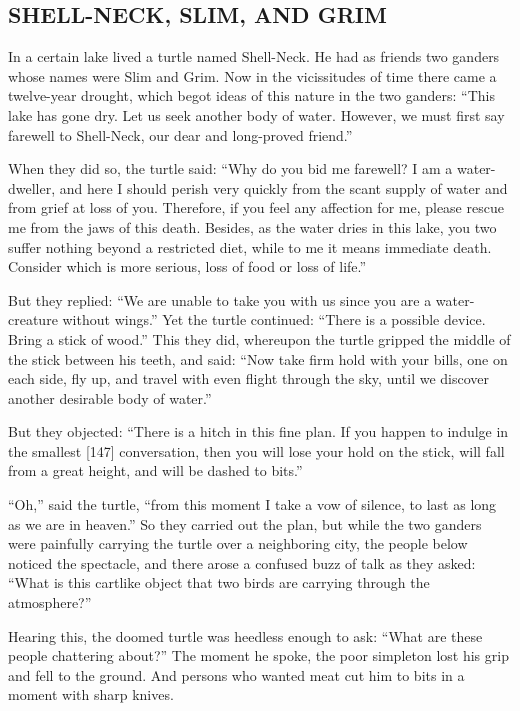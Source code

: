 \documentclass{article}
\begin{document}
\subsection{SHELL-NECK, SLIM, AND GRIM}

In a certain lake lived a turtle named Shell-Neck. He had as
friends two ganders whose names were Slim and Grim. Now in the
vicissitudes of time there came a twelve-year drought, which begot
ideas of this nature in the two ganders:
``This lake has gone dry. Let us seek another body of water. However, we must first say farewell to Shell-Neck, our dear and long-proved friend.''

When they did so, the turtle said:
``Why do you bid me farewell? I am a water-dweller, and here I should perish very quickly from the scant supply of water and from grief at loss of you. Therefore, if you feel any affection for me, please rescue me from the jaws of this death. Besides, as the water dries in this lake, you two suffer nothing beyond a restricted diet, while to me it means immediate death. Consider which is more serious, loss of food or loss of life.''

But they replied:
``We are unable to take you with us since you are a water-creature without wings.''
Yet the turtle continued:
``There is a possible device. Bring a stick of wood.'' This they
did, whereupon the turtle gripped the middle of the stick between
his teeth, and said:
``Now take firm hold with your bills, one on each side, fly up, and travel with even flight through the sky, until we discover another desirable body of water.''

But they objected:
``There is a hitch in this fine plan. If you happen to indulge in the smallest [147] conversation, then you will lose your hold on the stick, will fall from a great height, and will be dashed to bits.''

``Oh,'' said the turtle,
``from this moment I take a vow of silence, to last as long as we are in heaven.''
So they carried out the plan, but while the two ganders were
painfully carrying the turtle over a neighboring city, the people
below noticed the spectacle, and there arose a confused buzz of
talk as they asked:
``What is this cartlike object that two birds are carrying through the atmosphere?''

Hearing this, the doomed turtle was heedless enough to ask:
``What are these people chattering about?'' The moment he spoke,
the poor simpleton lost his grip and fell to the ground. And
persons who wanted meat cut him to bits in a moment with sharp
knives.
\end{document}

